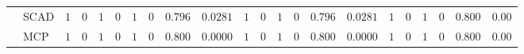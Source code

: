 \begin{tabular}{p{0.2cm}p{1cm}|p{0.6cm}p{0.6cm}|p{0.6cm}p{0.6cm}p{0.6cm}p{0.6cm}p{0.6cm}p{0.6cm}|p{0.6cm}p{0.6cm}p{0.6cm}p{0.6cm}p{0.6cm}p{0.6cm}|p{0.6cm}p{0.6cm}p{0.6cm}p{0.6cm}p{0.6cm}p{0.6cm}}
 & SCAD  & $1$ & $0$ & $1$ & $0$ & $1$ & $0$ & $0.796$ & $0.0281$ & $1$ & $0$ & $1$ & $0$ & $0.796$ & $0.0281$ & $1$ & $0$ & $1$ & $0$ & $0.800$ & $0.00$ \\
 & MCP  & $1$ & $0$ & $1$ & $0$ & $1$ & $0$ & $0.800$ & $0.0000$ & $1$ & $0$ & $1$ & $0$ & $0.800$ & $0.0000$ & $1$ & $0$ & $1$ & $0$ & $0.800$ & $0.00$ \\
\hline 
\end{tabular}

